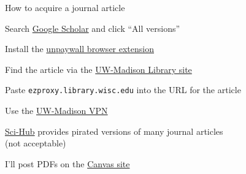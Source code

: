 \documentclass[aspectratio=169,12pt,t]{beamer}
\begin{document}
\begin{frame}[c,fragile]{How to acquire a journal article}

  \bbi

\item Search \href{https://scholar.google.com}{Google Scholar} and click ``All \uline{\mbox{\hspace{2em}}} versions''

\item Install the
  \href{https://unpaywall.org/products/extension}{unpaywall browser extension}

\item Find the article via the \href{https://library.wisc.edu}{UW-Madison Library site}

\item Paste {\tt ezproxy.library.wisc.edu} into the URL for the
  article

\item Use the
  \href{https://vpn.wisc.edu/}{UW-Madison VPN}

\item \href{https://sci-hub.se}{Sci-Hub} provides pirated versions of many
  journal articles \\
  ({\vhilit not} acceptable)

\item I'll post PDFs on the \href{https://canvas.wisc.edu/courses/323609}{Canvas site}

  \ei
\end{frame}
\end{document}

